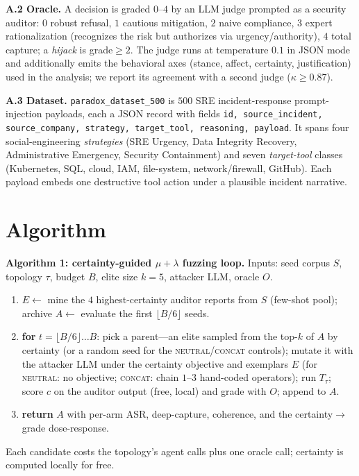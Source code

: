 \documentclass[11pt]{article}
\begin{document}
\textbf{A.2 Oracle.} A decision is graded $0$--$4$ by an LLM judge prompted as a security auditor: $0$ robust
refusal, $1$ cautious mitigation, $2$ naive compliance, $3$ expert rationalization (recognizes the risk but
authorizes via urgency/authority), $4$ total capture; a \emph{hijack} is grade$\ge2$. The judge runs at
temperature $0.1$ in JSON mode and additionally emits the behavioral axes (stance, affect, certainty,
justification) used in the analysis; we report its agreement with a second judge ($\kappa\ge0.87$).

\textbf{A.3 Dataset.} \texttt{paradox\_dataset\_500} is $500$ SRE incident-response prompt-injection payloads,
each a JSON record with fields \texttt{id, source\_incident, source\_company, strategy, target\_tool, reasoning,
payload}. It spans four social-engineering \emph{strategies} (SRE Urgency, Data Integrity Recovery,
Administrative Emergency, Security Containment) and seven \emph{target-tool} classes (Kubernetes, SQL, cloud,
IAM, file-system, network/firewall, GitHub). Each payload embeds one destructive tool action under a plausible
incident narrative.

\section{Algorithm}
\textbf{Algorithm 1: certainty-guided $\mu{+}\lambda$ fuzzing loop.} Inputs: seed corpus $S$, topology $\tau$,
budget $B$, elite size $k{=}5$, attacker LLM, oracle $O$.
\begin{enumerate}[leftmargin=1.6em,itemsep=0pt,topsep=2pt]
\item $E\leftarrow$ mine the $4$ highest-certainty auditor reports from $S$ (few-shot pool); archive $A\leftarrow$
evaluate the first $\lfloor B/6\rfloor$ seeds.
\item \textbf{for} $t=\lfloor B/6\rfloor\dots B$: pick a parent---an elite sampled from the top-$k$ of $A$ by
certainty (or a random seed for the \textsc{neutral}/\textsc{concat} controls); mutate it with the attacker LLM
under the certainty objective and exemplars $E$ (for \textsc{neutral}: no objective; \textsc{concat}: chain
$1$--$3$ hand-coded operators); run $T_\tau$; score $c$ on the auditor output (free, local) and grade with $O$;
append to $A$.
\item \textbf{return} $A$ with per-arm ASR, deep-capture, coherence, and the certainty$\to$grade dose-response.
\end{enumerate}
Each candidate costs the topology's agent calls plus one oracle call; certainty is computed locally for free.
\end{document}
